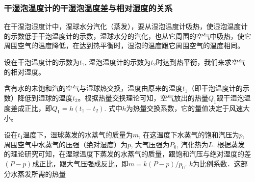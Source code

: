\subsubsection{干湿泡温度计的干湿泡温度差与相对湿度的关系}

在干湿泡湿度计中，湿球水分汽化（蒸发），要从湿泡温度计吸热，使湿泡温度计的示数低于干泡温度计的示数，湿球水分的汽化，也从它周围的空气中吸热，使它周围空气的温度降低，在达到热平衡时，湿泡的温度跟它周围空气的温度相同。

设在干泡温度计的示数为$t_1$, 湿泡温度计的示数为$t_2$时达到热平衡，我们来求空气的相对湿度。

含有水的未饱和汽的空气与湿球热交换，温度由原来的温度$t_1$（即干泡温度计的示数）降低到湿球的温度$t_2$。根据热量交换理论可知，空气放出的热量$Q_1$跟干湿泡温度差成正比，即$Q_1=h(t_1-t_2)$. 式中$h$为热量交换系数，它的量值决定于风速大小。

设在$t_1$温度下，湿球蒸发的水蒸气的质量为$m$, 在这温度下水蒸气的饱和汽压为$p$, 周围空气中水蒸气的压强（绝对湿度）为$p$, 大气压强为$P_0$, 汽化热为$L$. 根据蒸发的理论研究可知，在湿球温度下蒸发的水蒸气的质量，跟饱和汽压与绝对湿度的差$(P-p)$成正比，跟大气压强成反比，即$m=k(P-p)/p_0$. $k$为比例系数．这部分水蒸发所需的热量














